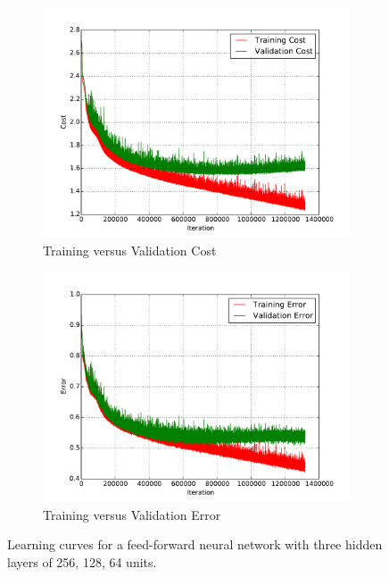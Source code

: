 \begin{figure}
	\centering
	\begin{subfigure}[b]{0.45\linewidth}
		\centering
		\includegraphics[width=\linewidth]{images/2/train_val_cost.pdf}
		\caption{Training versus Validation Cost}
	\end{subfigure}
	\hfill
	\begin{subfigure}[b]{0.45\linewidth}
		\centering
		\includegraphics[width=\linewidth]{images/2/train_val_error.pdf}
		\caption{Training versus Validation Error}
	\end{subfigure}
	\caption{Learning curves for a feed-forward neural network with three hidden layers of 256, 128, 64 units.} 
	\label{shrine2_curves}
\end{figure}
